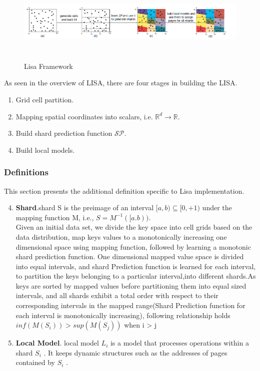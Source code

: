 \begin{figure}[t]
    \centering
    \includegraphics[width=17cm,height=4cm]{graphs/Lisa_Overview.png}
    \caption{Lisa Framework }
    \label{fig:Lisa_Framework}
\end{figure}

As seen in the overview of LISA, there are four stages in building the LISA. 
\begin{enumerate}
	\item Grid cell partition.
	\item Mapping spatial coordinates into scalars, i.e. $\mathbb{R}^d\to\mathbb{R}$.
	\item Build shard prediction function $\mathcal{SP}$.
	\item Build local models.
\end{enumerate}

\subsubsection{Definitions}

This section presents the additional definition specific to Lisa implementation.
\begin{enumerate}
\setcounter{enumi}{3}
	\item \textbf{Shard}.shard S is the preimage of an
interval $[a, b) \subseteq [0, +1)$ under the mapping function M,  i.e., $S = M^{-1}([a.b))$. \\
Given an initial data set, we divide the key space into cell grids based on the data distribution, map keys values to a monotonically increasing one dimensional space using mapping function, followed by learning a monotonic shard prediction function. One dimensional mapped value space is divided into equal intervals, and shard Prediction function is learned for each interval, to partition the keys belonging to a particular interval,into different shards.As keys are sorted by mapped values before partitioning them into equal sized intervals, and all shards exhibit a total order with respect to their corresponding intervals in the mapped range(Shard Prediction function for each interval is monotonically increasing), following relationship holds \\
$ inf (M(S_{i}))  > sup (M(S_{j}))$ when i > j 

    
\item \textbf{Local Model}. local model $L_{i}$ is a model
that processes operations within a shard $S_i$ . It keeps dynamic
structures such as the addresses of pages contained by $S_{i}$ .
\end{enumerate}

